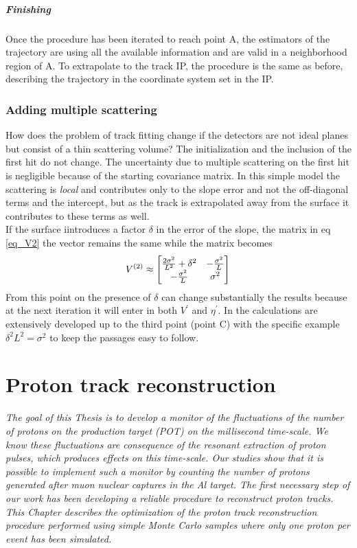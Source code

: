 \documentclass[12pt,a4paper,openright, oneside, titlepage]{book} %
\begin{document}
\paragraph{Finishing} Once the procedure has been iterated  to reach point A, 
the estimators of the trajectory are using all the available information and are valid in a neighborhood region of A. 
To extrapolate to the track IP, 
the procedure is the same as before, 
describing the trajectory in the coordinate system set in the IP. 

\subsection*{Adding multiple scattering}
How does the problem of track fitting change if the detectors are not ideal planes but consist of a thin scattering volume? 
The initialization and the inclusion of the first hit do not change. 
The uncertainty due to multiple scattering on the first hit is negligible because of the starting covariance matrix. 
In this simple model the scattering is \textit{local} and contributes only to the slope error and not the off-diagonal terms 
and the intercept, but as the track is extrapolated away from the surface it contributes to these terms as well.\\
If the surface iintroduces a factor $\delta$ in the error of the slope, 
the matrix in eq \ref{eq_V2} the vector remains the same while the matrix becomes
$$
V^{(2)}\approx
\begin{bmatrix}
\frac{2\sigma^2}{L^2}+\delta^2 & -\frac{\sigma^2}{L} \\
-\frac{\sigma^2}{L} & \sigma^2
\end{bmatrix}\\
$$
From this point on the presence of $\delta$ can change substantially the results because at the next iteration it will enter in both $V^\prime$ and $\eta^\prime$.
 In \cite{KutschkePaper} the calculations are extensively developed up to the third point (point C) 
 with the specific example $\delta^2L^2=\sigma^2$ to keep the passages easy to follow.

\chapter{Proton track reconstruction}
{\itshape 
The goal of this Thesis is to develop a monitor of the fluctuations of the number of protons on the production target (POT) on the millisecond time-scale. 
We know these fluctuations are consequence of the resonant extraction of proton pulses, which produces effects on this time-scale. 
Our studies show that it is possible to implement such a monitor by counting the number of protons generated after muon nuclear captures in the Al target. 
The first necessary step of our work has been developing a reliable procedure to reconstruct proton tracks.  
This Chapter describes the optimization of the proton track reconstruction procedure performed using simple Monte Carlo samples where only one proton per event has been simulated.}
\end{document}

